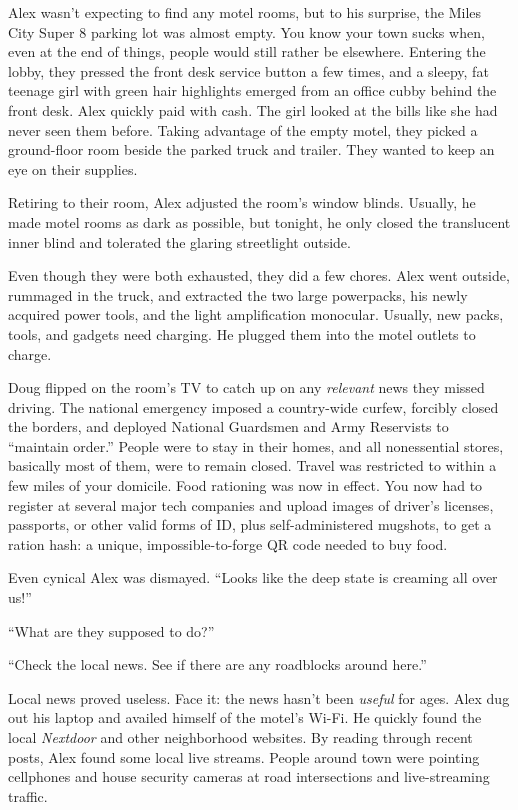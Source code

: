 Alex wasn't expecting to find any motel rooms, but to his surprise, the
Miles City Super 8 parking lot was almost empty. You know your town
sucks when, even at the end of things, people would still rather be
elsewhere. Entering the lobby, they pressed the front desk service
button a few times, and a sleepy, fat teenage girl with green hair
highlights emerged from an office cubby behind the front desk. Alex
quickly paid with cash. The girl looked at the bills like she had never
seen them before. Taking advantage of the empty motel, they picked a
ground-floor room beside the parked truck and trailer. They wanted to
keep an eye on their supplies.

Retiring to their room, Alex adjusted the room's window blinds. Usually,
he made motel rooms as dark as possible, but tonight, he only closed the
translucent inner blind and tolerated the glaring streetlight outside.

Even though they were both exhausted, they did a few chores. Alex went
outside, rummaged in the truck, and extracted the two large powerpacks,
his newly acquired power tools, and the light amplification monocular.
Usually, new packs, tools, and gadgets need charging. He plugged them
into the motel outlets to charge.

Doug flipped on the room's TV to catch up on any \emph{relevant} news
they missed driving. The national emergency imposed a country-wide
curfew, forcibly closed the borders, and deployed National Guardsmen and
Army Reservists to ``maintain order.'' People were to stay in their
homes, and all nonessential stores, basically most of them, were to
remain closed. Travel was restricted to within a few miles of your
domicile. Food rationing was now in effect. You now had to register at
several major tech companies and upload images of driver's licenses,
passports, or other valid forms of ID, plus self-administered mugshots,
to get a ration hash: a unique, impossible-to-forge QR code needed to
buy food.

Even cynical Alex was dismayed. ``Looks like the deep state is creaming
all over us!''

``What are they supposed to do?''

``Check the local news. See if there are any roadblocks around here.''

Local news proved useless. Face it: the news hasn't been \emph{useful}
for ages. Alex dug out his laptop and availed himself of the motel's
Wi-Fi. He quickly found the local \emph{Nextdoor} and other neighborhood
websites. By reading through recent posts, Alex found some local live
streams. People around town were pointing cellphones and house security
cameras at road intersections and live-streaming traffic.

